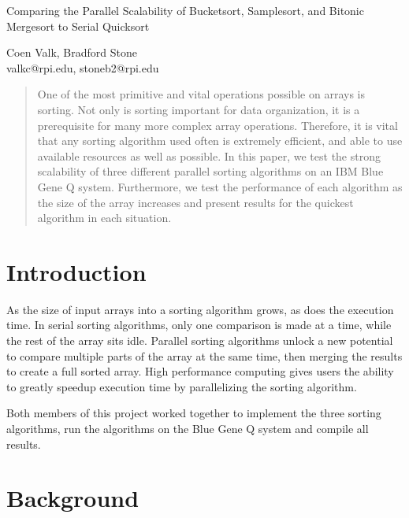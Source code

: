 \documentclass[10pt,letterpaper]{article}
\begin{document}
\begin{center}
\begin{huge}
Comparing the Parallel Scalability of Bucketsort, Samplesort, and Bitonic Mergesort to Serial Quicksort\\
\end{huge}
\vspace{0.25in}
\begin{large}
Coen Valk, Bradford Stone\\
valkc@rpi.edu, stoneb2@rpi.edu\\
\end{large}
\end{center}
\vspace{0.25in}
\begin{multicols}{2}
\begin{abstract}
One of the most primitive and vital operations possible on arrays is sorting. Not only is sorting important for data organization, it is a prerequisite for many more complex array operations. Therefore, it is vital that any sorting algorithm used often is extremely efficient, and able to use available resources as well as possible. In this paper, we test the strong scalability of three different parallel sorting algorithms on an IBM Blue Gene Q system. Furthermore, we test the performance of each algorithm as the size of the array increases and present results for the quickest algorithm in each situation.
\end{abstract}
\section{Introduction}
As the size of input arrays into a sorting algorithm grows, as does the execution time. In serial sorting algorithms, only one comparison is made at a time, while the rest of the array sits idle. Parallel sorting algorithms unlock a new potential to compare multiple parts of the array at the same time, then merging the results to create a full sorted array. High performance computing gives users the ability to greatly speedup execution time by parallelizing the sorting algorithm.

Both members of this project worked together to implement the three sorting algorithms, run the algorithms on the Blue Gene Q system and compile all results.

\section{Background}


\end{multicols}
\end{document}

